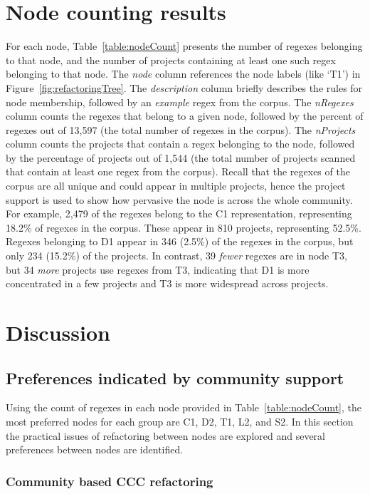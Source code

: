\section{Node counting results}



For each node, Table~\ref{table:nodeCount} presents the number of regexes belonging to that node, and the number of projects containing at least one such regex belonging to that node. The \emph{node} column references the node labels (like `T1') in Figure~\ref{fig:refactoringTree}.  The \emph{description} column briefly describes the rules for node membership, followed by an \emph{example} regex from the corpus. The \emph{nRegexes} column counts the regexes that belong to a given node, followed by the percent of regexes out of 13,597 (the total number of regexes in the corpus). The \emph{nProjects} column counts the projects that contain a regex belonging to the node, followed by the percentage of projects out of 1,544 (the total number of projects scanned that contain at least one regex from the corpus). Recall that the regexes of the corpus are all unique and could appear in multiple projects, hence the project support is used to show how pervasive the node is across the whole community. For example, 2,479 of the regexes belong to the C1 representation, representing 18.2\% of regexes in the corpus. These appear in 810 projects, representing 52.5\%. Regexes belonging to D1 appear in 346 (2.5\%) of the regexes in the corpus, but only 234 (15.2\%) of the projects. In contrast, 39 \emph{fewer} regexes are in node T3, but 34 \emph{more} projects use regexes from T3, indicating that D1 is more concentrated in a few projects and T3 is more widespread across projects.

\section{Discussion}

\subsection{Preferences indicated by community support}
Using the count of regexes in each node provided in Table~\ref{table:nodeCount}, the most preferred nodes for each group are C1, D2, T1, L2, and S2.  In this section the practical issues of refactoring between nodes are explored and several preferences between nodes are identified.

\subsubsection{Community based CCC refactoring}

